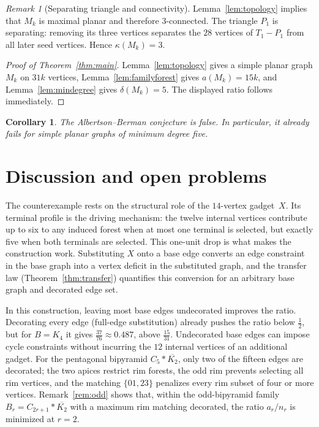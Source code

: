 \documentclass[11pt]{article}
\newtheorem{corollary}[theorem]{Corollary}
\theoremstyle{definition}
\theoremstyle{remark}
\newtheorem{remark}[theorem]{Remark}
\begin{document}
\begin{remark}[Separating triangle and connectivity]\label{rem:connectivity}
Lemma~\ref{lem:topology} implies that $M_k$ is maximal planar and therefore
$3$-connected.  The triangle $P_1$ is separating: removing its three vertices
separates the $28$ vertices of $T_1-P_1$ from all later seed vertices.  Hence
$\kappa(M_k)=3$.
\end{remark}

\begin{proof}[Proof of Theorem~\ref{thm:main}]
Lemma~\ref{lem:topology} gives a simple planar graph $M_k$ on $31k$ vertices,
Lemma~\ref{lem:familyforest} gives $a(M_k)=15k$, and
Lemma~\ref{lem:mindegree} gives $\delta(M_k)=5$.  The displayed ratio follows
immediately.
\end{proof}

\begin{corollary}
The Albertson--Berman conjecture is false.  In particular, it already fails
for simple planar graphs of minimum degree five.
\end{corollary}

\section{Discussion and open problems}

The counterexample rests on the structural role of the $14$-vertex
gadget~$X$.  Its terminal profile is the driving mechanism: the twelve
internal vertices contribute up to six to any induced forest when at most one
terminal is selected, but exactly five when both terminals are selected.
This one-unit drop is what makes the construction work.  Substituting $X$
onto a base edge converts an edge constraint in the base graph into a vertex
deficit in the substituted graph, and the transfer law
(Theorem~\ref{thm:transfer}) quantifies this conversion for an arbitrary
base graph and decorated edge set.

In this construction, leaving most base edges undecorated improves the ratio.
Decorating every edge (full-edge substitution) already pushes the ratio below
$\frac{1}{2}$, but for $B=K_4$ it gives $\frac{37}{76}\approx0.487$, above
$\frac{15}{31}$.  Undecorated base edges can impose cycle constraints without
incurring the $12$ internal vertices of an additional gadget.  For the
pentagonal bipyramid $C_5*\overline{K_2}$, only two of the fifteen edges are
decorated; the two apices restrict rim forests, the odd rim prevents selecting
all rim vertices, and the matching $\{01,23\}$ penalizes every rim subset of
four or more vertices.  Remark~\ref{rem:odd} shows that, within the odd-bipyramid
family $B_r=C_{2r+1}*\overline{K_2}$ with a maximum rim matching decorated, the
ratio $a_r/n_r$ is minimized at $r=2$.
\end{document}
